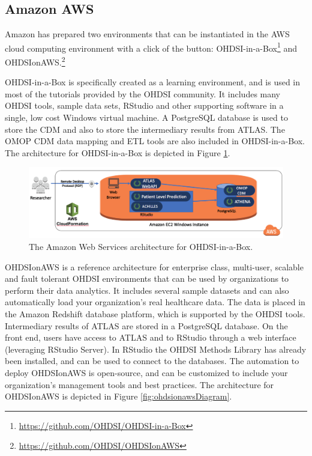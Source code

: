 \documentclass[11pt]{book}
\let\rmarkdownfootnote\footnote%
\def\footnote{\protect\rmarkdownfootnote}
\theoremstyle{definition}
\theoremstyle{definition}
\theoremstyle{definition}
\theoremstyle{remark}
\begin{document}
\subsection{Amazon AWS}\label{amazon-aws}

Amazon has prepared two environments that can be instantiated in the AWS
cloud computing environment with a click of the button:
OHDSI-in-a-Box\footnote{\url{https://github.com/OHDSI/OHDSI-in-a-Box}}
and OHDSIonAWS.\footnote{\url{https://github.com/OHDSI/OHDSIonAWS}}

OHDSI-in-a-Box is specifically created as a learning environment, and is
used in most of the tutorials provided by the OHDSI community. It
includes many OHDSI tools, sample data sets, RStudio and other
supporting software in a single, low cost Windows virtual machine. A
PostgreSQL database is used to store the CDM and also to store the
intermediary results from ATLAS. The OMOP CDM data mapping and ETL tools
are also included in OHDSI-in-a-Box. The architecture for OHDSI-in-a-Box
is depicted in Figure \ref{fig:ohdsiinaboxDiagram}.

\begin{figure}

{\centering \includegraphics[width=1\linewidth]{images/OhdsiAnalyticsTools/OHDSI-in-a-BoxDiagram} 

}

\caption{The Amazon Web Services architecture for OHDSI-in-a-Box.}\label{fig:ohdsiinaboxDiagram}
\end{figure}

OHDSIonAWS is a reference architecture for enterprise class, multi-user,
scalable and fault tolerant OHDSI environments that can be used by
organizations to perform their data analytics. It includes several
sample datasets and can also automatically load your organization's real
healthcare data. The data is placed in the Amazon Redshift database
platform, which is supported by the OHDSI tools. Intermediary results of
ATLAS are stored in a PostgreSQL database. On the front end, users have
access to ATLAS and to RStudio through a web interface (leveraging
RStudio Server). In RStudio the OHDSI Methods Library has already been
installed, and can be used to connect to the databases. The automation
to deploy OHDSIonAWS is open-source, and can be customized to include
your organization's management tools and best practices. The
architecture for OHDSIonAWS is depicted in Figure
\ref{fig:ohdsionawsDiagram}.
\end{document}
